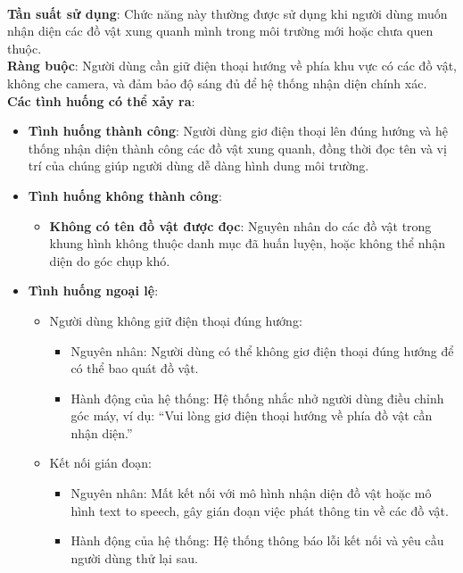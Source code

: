 \documentclass[a4paper,12pt]{article}
\begin{document}
\\
\textbf{Tần suất sử dụng}: Chức năng này thường được sử dụng khi người dùng muốn nhận diện các đồ vật xung quanh mình trong môi trường mới hoặc chưa quen thuộc.
\\
\textbf{Ràng buộc}: Người dùng cần giữ điện thoại hướng về phía khu vực có các đồ vật, không che camera, và đảm bảo độ sáng đủ để hệ thống nhận diện chính xác.
\\
\textbf{Các tình huống có thể xảy ra}:
\\
\begin{itemize}
    \item \textbf{Tình huống thành công}: Người dùng giơ điện thoại lên đúng hướng và hệ thống nhận diện thành công các đồ vật xung quanh, đồng thời đọc tên và vị trí của chúng giúp người dùng dễ dàng hình dung môi trường.
    \item \textbf{Tình huống không thành công}:
    \begin{itemize}
        \item \textbf{Không có tên đồ vật được đọc}: Nguyên nhân do các đồ vật trong khung hình không thuộc danh mục đã huấn luyện, hoặc không thể nhận diện do góc chụp khó.
    \end{itemize}
    \item \textbf{Tình huống ngoại lệ}:
    \begin{itemize}
        \item Người dùng không giữ điện thoại đúng hướng: 
        \begin{itemize}
            \item Nguyên nhân: Người dùng có thể không giơ điện thoại đúng hướng để có thể bao quát đồ vật.
            \item Hành động của hệ thống: Hệ thống nhắc nhở người dùng điều chỉnh góc máy, ví dụ: “Vui lòng giơ điện thoại hướng về phía đồ vật cần nhận diện.”
        \end{itemize}
        \item Kết nối gián đoạn: 
        \begin{itemize}
            \item Nguyên nhân: Mất kết nối với mô hình nhận diện đồ vật hoặc mô hình text to speech, gây gián đoạn việc phát thông tin về các đồ vật.
            \item Hành động của hệ thống: Hệ thống thông báo lỗi kết nối và yêu cầu người dùng thử lại sau.
        \end{itemize}
    \end{itemize}
\end{itemize}
\end{document}
